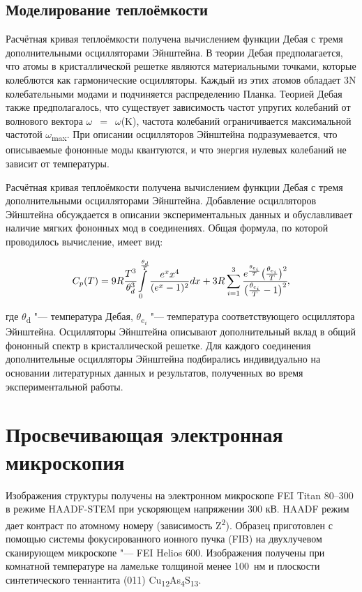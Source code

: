 \subsection{Моделирование теплоёмкости}\label{sect2_4_2}
Расчётная кривая теплоёмкости получена вычислением функции Дебая с тремя дополнительными осцилляторами Эйнштейна. В теории Дебая предполагается, что атомы в кристаллической решетке являются материальными точками, которые колеблются как гармонические осцилляторы.
Каждый из этих атомов обладает 3N колебательными модами и подчиняется распределению Планка.
Теорией Дебая также предполагалось, что существует зависимость частот упругих колебаний от волнового вектора $\omega$~$=$~$\omega$(K), частота колебаний ограничивается максимальной частотой $\omega$\textsubscript{max}. При описании осцилляторов Эйнштейна подразумевается, что описываемые фононные моды квантуются, и что энергия нулевых колебаний не зависит от температуры.

Расчётная кривая теплоёмкости получена вычислением функции Дебая с тремя дополнительными осцилляторами Эйнштейна. Добавление осцилляторов Эйнштейна обсуждается в описании экспериментальных данных и обуславливает наличие мягких фононных мод в соединениях. Общая формула, по которой проводилось вычисление, имеет вид:

\begin{equation}
  \label{eq:equation2_4}
C_p(T)=9R\cfrac{T^3}{\theta_d^3}\int\limits_0^{\frac{\theta_d}{T}}\frac{e^xx^4}{(e^x-1)^2}dx+3R\sum_{i=1}^3\cfrac{e^{\frac{\theta_{e_i}}{T}}\big(\frac{\theta_{e_i}}{T}\big)^2}{\big(\frac{\theta_{e_i}}{T}-1\big)^2},
\end{equation}

где $\theta$\textsubscript{d} "--- температура Дебая, $\theta$\textsubscript{$e_i$} "--- температура соответствующего осциллятора Эйнштейна.
Осцилляторы Эйнштейна описывают дополнительный вклад в общий фононный спектр в кристаллической решетке.
Для каждого соединения дополнительные осцилляторы Эйнштейна подбирались индивидуально на основании  литературных данных и результатов, полученных во время экспериментальной работы.
\newpage
\section{Просвечивающая электронная микроскопия} \label{sect2_4}

Изображения структуры получены на электронном микроскопе FEI Titan 80--300 в режиме HAADF-STEM  при ускоряющем напряжении 300 кВ.
HAADF режим дает контраст по атомному номеру (зависимость Z\textsuperscript{2}).
Образец приготовлен с помощью системы фокусированного ионного пучка (FIB) на двухлучевом сканирующем микроскопе "--- FEI Helios 600.
Изображения получены при комнатной температуре на ламельке толщиной менее 100~нм и плоскости синтетического теннантита (011) Cu\textsubscript{12}As\textsubscript{4}S\textsubscript{13}.


